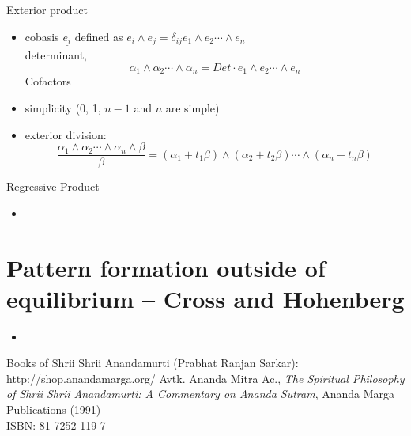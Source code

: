 \documentclass[12pt]{book}
\begin{document}
Exterior product
\begin{itemize}
\item 
  cobasis $\underline{e_i}$ defined as $e_i \wedge \underline{e_j} = \delta_{ij}  e_1 \wedge e_2 \cdots \wedge e_n$ \\
  determinant, 
  \[
    \alpha_1 \wedge \alpha_2 \cdots \wedge \alpha_n = Det \cdot 
    e_1 \wedge e_2 \cdots \wedge e_n
  \]
  Cofactors
\item
  simplicity (0, 1, $n-1$ and $n$ are simple)
\item
  exterior division: 
  \[
    \frac{ \alpha_1 \wedge \alpha_2 \cdots \wedge \alpha_n \wedge \beta} {\beta} =
    (\alpha_1 + t_1 \beta) \wedge (\alpha_2 + t_2 \beta)\cdots \wedge (\alpha_n + t_n \beta)
  \]
\end{itemize}

Regressive Product
\begin{itemize}
\item 
  
\end{itemize}

\chapter{Pattern formation outside of equilibrium -- Cross and Hohenberg}
\begin{itemize}
\item 
\end{itemize}

\backmatter
%
\begin{thebibliography}{99}
Books of Shrii Shrii Anandamurti (Prabhat Ranjan Sarkar): \\
http://shop.anandamarga.org/
Avtk. Ananda Mitra Ac., \emph{The Spiritual Philosophy of Shrii Shrii Anandamurti: A Commentary on Ananda Sutram}, Ananda Marga Publications (1991) \\
ISBN: 81-7252-119-7
\end{thebibliography}
\end{document}
